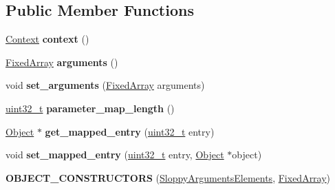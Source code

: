 \subsection*{Public Member Functions}
\begin{DoxyCompactItemize}
\item 
\mbox{\label{classv8_1_1internal_1_1SloppyArgumentsElements_a6b8201c3428ca96fc6a9285f485e5295}} 
\mbox{\hyperlink{classv8_1_1internal_1_1Context}{Context}} {\bfseries context} ()
\item 
\mbox{\label{classv8_1_1internal_1_1SloppyArgumentsElements_a190a4029da73766481788cc4016c659f}} 
\mbox{\hyperlink{classv8_1_1internal_1_1FixedArray}{Fixed\+Array}} {\bfseries arguments} ()
\item 
\mbox{\label{classv8_1_1internal_1_1SloppyArgumentsElements_a29687daa133fce6082aa651c0680fd7d}} 
void {\bfseries set\+\_\+arguments} (\mbox{\hyperlink{classv8_1_1internal_1_1FixedArray}{Fixed\+Array}} arguments)
\item 
\mbox{\label{classv8_1_1internal_1_1SloppyArgumentsElements_a795ee929abe581ad7e1f22ed27a7b09e}} 
\mbox{\hyperlink{classuint32__t}{uint32\+\_\+t}} {\bfseries parameter\+\_\+map\+\_\+length} ()
\item 
\mbox{\label{classv8_1_1internal_1_1SloppyArgumentsElements_a68f03b11dfe32dd96c7f551c92026b4c}} 
\mbox{\hyperlink{classv8_1_1internal_1_1Object}{Object}} $\ast$ {\bfseries get\+\_\+mapped\+\_\+entry} (\mbox{\hyperlink{classuint32__t}{uint32\+\_\+t}} entry)
\item 
\mbox{\label{classv8_1_1internal_1_1SloppyArgumentsElements_a25b065e1d0b2c82e6977d4405bb9d79e}} 
void {\bfseries set\+\_\+mapped\+\_\+entry} (\mbox{\hyperlink{classuint32__t}{uint32\+\_\+t}} entry, \mbox{\hyperlink{classv8_1_1internal_1_1Object}{Object}} $\ast$object)
\item 
\mbox{\label{classv8_1_1internal_1_1SloppyArgumentsElements_a904f267c72971a044e546231752bf1e1}} 
{\bfseries O\+B\+J\+E\+C\+T\+\_\+\+C\+O\+N\+S\+T\+R\+U\+C\+T\+O\+RS} (\mbox{\hyperlink{classv8_1_1internal_1_1SloppyArgumentsElements}{Sloppy\+Arguments\+Elements}}, \mbox{\hyperlink{classv8_1_1internal_1_1FixedArray}{Fixed\+Array}})
\end{DoxyCompactItemize}
